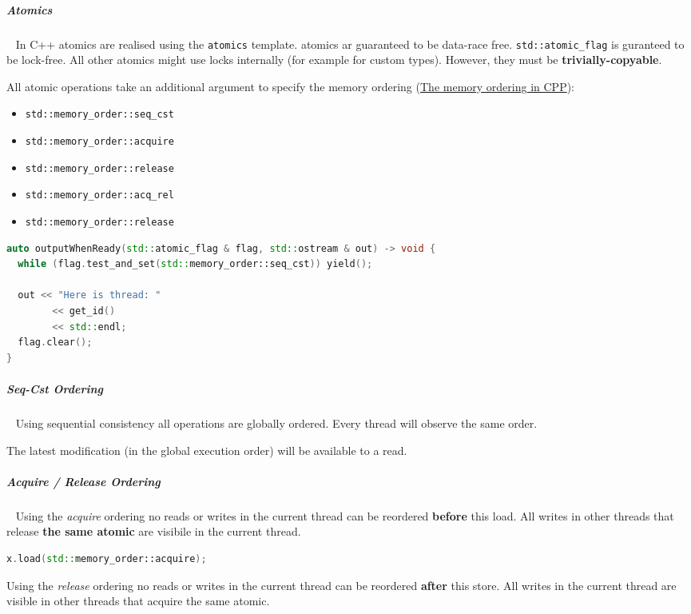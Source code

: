 \documentclass[11pt,twoside,landscape]{article}
\begin{document}
\begin{multicols}{2}
\subparagraph{Atomics} \
\label{sec:org7374435}
In C++ atomics are realised using the \texttt{atomics} template.
atomics ar guaranteed to be data-race free.
\texttt{std::atomic\_flag} is guranteed to be lock-free.
All other atomics might use locks internally (for example for custom types).
However, they must be \textbf{trivially-copyable}.

All atomic operations take an additional argument to specify the memory ordering (\href{../../../roam/20230629160255-the_memory_ordering_in_cpp.org}{The memory ordering in CPP}):
\begin{itemize}
\item \texttt{std::memory\_order::seq\_cst}
\item \texttt{std::memory\_order::acquire}
\item \texttt{std::memory\_order::release}
\item \texttt{std::memory\_order::acq\_rel}
\item \texttt{std::memory\_order::release}
\end{itemize}


\begin{lstlisting}[language=c++,label=lst:example-for-atomic_flag,caption={Example for atomic\textsubscript{flag}},captionpos=b,numbers=none]
auto outputWhenReady(std::atomic_flag & flag, std::ostream & out) -> void {
  while (flag.test_and_set(std::memory_order::seq_cst)) yield();

  out << "Here is thread: "
        << get_id()
        << std::endl;
  flag.clear();
}
\end{lstlisting}

\subparagraph{Seq-Cst Ordering} \
\label{sec:orga199e32}
Using sequential consistency all operations are globally ordered.
Every thread will observe the same order.

The latest modification (in the global execution order) will be available to a read.

\subparagraph{Acquire / Release Ordering} \
\label{sec:org69b44ca}
Using the \emph{acquire} ordering no reads or writes in the current thread can be reordered \textbf{before} this load.
All writes in other threads that release \textbf{the same atomic} are visibile in the current thread.

\begin{lstlisting}[language=c++,numbers=none]
x.load(std::memory_order::acquire);
\end{lstlisting}

Using the \emph{release} ordering no reads or writes in the current thread can be reordered \textbf{after} this store.
All writes in the current thread are visible in other threads that acquire the same atomic.


\end{multicols}
\end{document}

